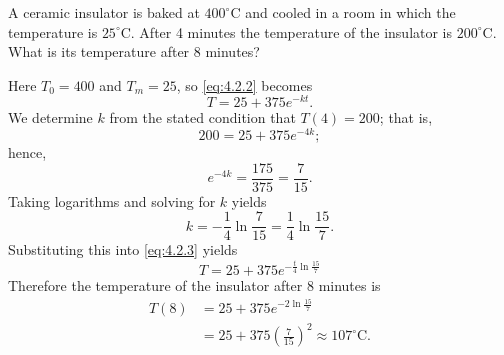 \documentclass{ximera}
\begin{document}
 
\begin{example}\label{example:4.2.1}
A ceramic insulator is baked at $400^\circ$C and cooled in a room in
which the temperature is $25^\circ$C. After 4 minutes the
temperature of the insulator is $200^\circ$C. What is its temperature
after 8 minutes?
\begin{explanation} Here $T_0=400$ and $T_m=25$, so \eqref{eq:4.2.2} becomes
\begin{equation} \label{eq:4.2.3}
T=25+375e^{-kt}.
\end{equation}
 We determine $k$ from the stated condition that  $T(4)=200$;
that is,
$$
200=25+375e^{-4k};
$$
 hence,
$$
e^{-4k} = \frac{175}{375} = \frac{7}{15}.
$$
 Taking logarithms and solving for $k$ yields
$$
k=-\frac{1}{4} \ln \frac{7}{15}=\frac{1}{4}\ln \frac{15}{7}.
$$
 Substituting this into \eqref{eq:4.2.3} yields
$$
T=25+375 e^{-\frac{t}{4} \ln \frac{15}{7}}
$$
Therefore the temperature of the insulator after
8 minutes is
$$\begin{array}{rl}
T(8) & = 25+375 e^{-2 \ln \frac{15}{7}} \\
& = 25+375 \left(\frac{7}{15}\right)^2 \approx
107^\circ \mbox{C}.
\end{array}$$

\begin{center}
\end{center}

  
\end{explanation}
\end{example}
 
\end{document}
